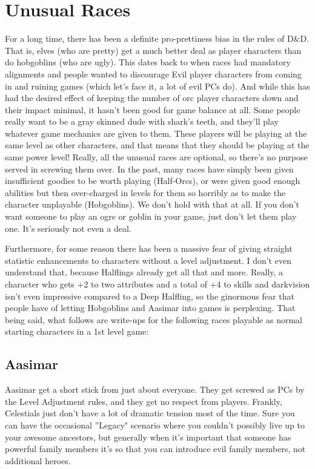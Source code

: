 
\section{Unusual Races}

For a long time, there has been a definite pro-prettiness bias in the rules of D\&D. That is, elves (who are pretty) get a much better deal as player characters than do hobgoblins (who are ugly). This dates back to when races had mandatory alignments and people wanted to discourage Evil player characters from coming in and ruining games (which let's face it, a lot of evil PCs do). And while this has had the desired effect of keeping the number of orc player characters down and their impact minimal, it hasn't been good for game balance at all. Some people really want to be a gray skinned dude with shark's teeth, and they'll play whatever game mechanics are given to them. These players will be playing at the same level as other characters, and that means that they should be playing at the same power level! Really, all the unusual races are optional, so there's no purpose served in screwing them over. In the past, many races have simply been given insufficient goodies to be worth playing (Half-Orcs), or were given good enough abilities but then over-charged in levels for them so horribly as to make the character unplayable (Hobgoblins). We don't hold with that at all. If you don't want someone to play an ogre or goblin in your game, just don't let them play one. It's seriously not even a deal.

Furthermore, for some reason there has been a massive fear of giving straight statistic enhancements to characters without a level adjustment. I don't even understand that, because Halflings already get all that and more. Really, a character who gets +2 to two attributes and a total of +4 to skills and darkvision isn't even impressive compared to a Deep Halfling, so the ginormous fear that people have of letting Hobgoblins and Aasimar into games is perplexing. That being said, what follows are write-ups for the following races playable as normal starting characters in a 1st level game:

\subsection{Aasimar}
\vspace*{-8pt}

Aasimar get a short stick from just about everyone. They get screwed as PCs by the Level Adjustment rules, and they get no respect from players. Frankly, Celestials just don't have a lot of dramatic tension most of the time. Sure you can have the occasional ''Legacy" scenario where you couldn't possibly live up to your awesome ancestors, but generally when it's important that someone has powerful family members it's so that you can introduce evil family members, not additional heroes.


